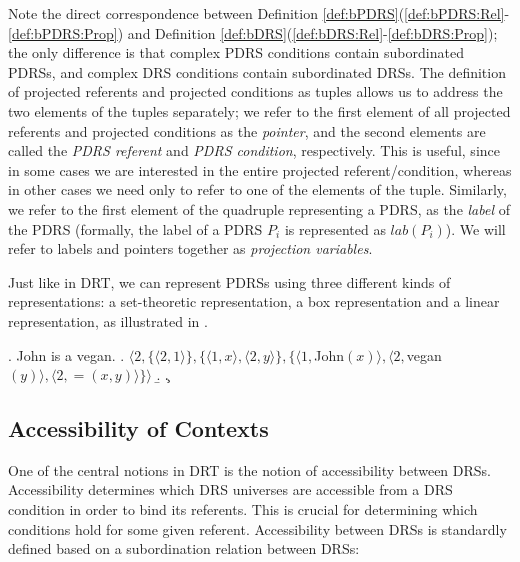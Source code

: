 \noindent Note the direct correspondence between Definition
\ref{def:bPDRS}(\ref{def:bPDRS:Rel}-\ref{def:bPDRS:Prop}) and Definition
\ref{def:bDRS}(\ref{def:bDRS:Rel}-\ref{def:bDRS:Prop}); the only difference
is that complex PDRS conditions contain subordinated PDRSs, and complex DRS
conditions contain subordinated DRSs.  The definition of projected referents
and projected conditions as tuples allows us to address the two elements
of the tuples separately; we refer to the first element of all projected
referents and projected conditions as the \textit{pointer}, and the second
elements are called the \textit{PDRS referent} and \textit{PDRS condition},
respectively. This is useful, since in some cases we are interested in the
entire projected referent/condition, whereas in other cases we need only to
refer to one of the elements of the tuple. Similarly, we refer to the first
element of the quadruple representing a PDRS, as the \textit{label} of the
PDRS (formally, the label of a PDRS $P_i$ is represented as $lab(P_i)$).
We will refer to labels and pointers together as \textit{projection
variables}.

Just like in DRT, we can represent PDRSs using three different kinds of
representations: a set-theoretic representation, a box representation
and a linear representation, as illustrated in \Next.

\ex. John is a vegan.
\a. $\langle 2, \{\langle 2,1\rangle\}, \{\langle 1, x\rangle, 
      \langle 2, y\rangle\},\{\langle1, $John$(x)\rangle,\langle2, 
      $vegan$(y)\rangle, \langle 2, =(x,y)\rangle\}\rangle$
\b. 
\c. 


\subsection{Accessibility of Contexts}

One of the central notions in DRT is the notion of accessibility between
DRSs. Accessibility determines which DRS universes are accessible from a DRS
condition in order to bind its referents. This is crucial for determining
which conditions hold for some given referent.  Accessibility between DRSs
is standardly defined based on a subordination relation between DRSs: 


